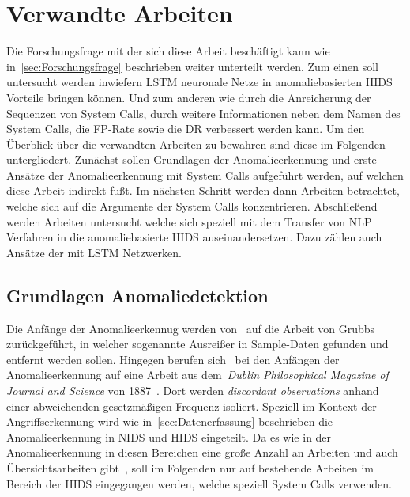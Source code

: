 \chapter{Verwandte Arbeiten}\label{ch:verwandte_arbeiten}

Die Forschungsfrage mit der sich diese Arbeit beschäftigt kann wie in~\autoref{sec:Forschungsfrage} beschrieben weiter unterteilt werden.
Zum einen soll untersucht werden inwiefern \ac{LSTM} neuronale Netze in anomaliebasierten \ac{HIDS} Vorteile bringen können.
Und zum anderen wie durch die Anreicherung der Sequenzen von System Calls, durch weitere Informationen neben dem Namen des System Calls, die \ac{FP}-Rate sowie die \ac{DR} verbessert werden kann.
Um den Überblick über die verwandten Arbeiten zu bewahren sind diese im Folgenden untergliedert.
Zunächst sollen Grundlagen der Anomalieerkennung und erste Ansätze der Anomalieerkennung mit System Calls aufgeführt werden, auf welchen diese Arbeit indirekt fußt.
Im nächsten Schritt werden dann Arbeiten betrachtet, welche sich auf die Argumente der System Calls konzentrieren.
Abschließend werden Arbeiten untersucht welche sich speziell mit dem Transfer von \ac{NLP} Verfahren in die anomaliebasierte \ac{HIDS} auseinandersetzen.
Dazu zählen auch Ansätze der mit \ac{LSTM} Netzwerken.

\section{Grundlagen Anomaliedetektion}

    Die Anfänge der Anomalieerkennug werden von~\cite{ANOMALYBOOKKISHAN2017} auf die Arbeit von Grubbs~\cite{ANOMALYDEFINITION1969} zurückgeführt, in welcher sogenannte Ausreißer in Sample-Daten gefunden und entfernt werden sollen.
    Hingegen berufen sich~\cite{ANOMALYSURVEY} bei den Anfängen der Anomalieerkennung auf eine Arbeit aus dem~\textit{Dublin Philosophical Magazine of Journal and Science} von 1887~\cite{ANOMALYDEFINITION1887}.
    Dort werden \textit{discordant observations} anhand einer abweichenden gesetzmäßigen Frequenz isoliert. 
    Speziell im Kontext der Angriffserkennung wird wie in~\autoref{sec:Datenerfassung} beschrieben die Anomalieerkennung in \ac{NIDS} und \ac{HIDS} eingeteilt.
    Da es wie in der Anomalieerkennung in diesen Bereichen eine große Anzahl an Arbeiten und auch Übersichtsarbeiten gibt~\cite{ANOMALYSURVEY, ANOMALYSURVEY2, ANOMALYSURVEY3}, soll im Folgenden nur auf bestehende Arbeiten im Bereich der \ac{HIDS} eingegangen werden, welche speziell System Calls verwenden.

